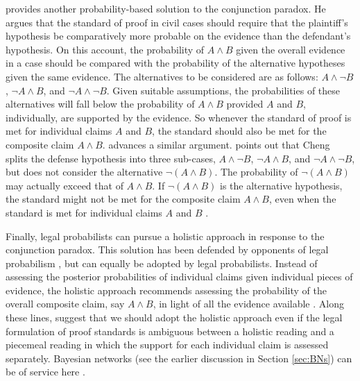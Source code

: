 \documentclass{article}
\begin{document}
 



\cite{cheng2012reconceptualizing} provides another probability-based solution to the conjunction paradox. He argues that the standard of proof in civil cases should require that the plaintiff's hypothesis be comparatively more probable on the evidence than the defendant's hypothesis. %
 On this account, the probability of $A\wedge B$ given the overall evidence in a case should be compared with the probability of the alternative hypotheses given the same evidence. The alternatives to be considered  are as follows: $A\wedge \neg B$, $\neg A \wedge B$, and $\neg A \wedge \neg B$. Given suitable assumptions, the probabilities of these alternatives will fall below the probability of $A\wedge B$ provided $A$ and $B$, individually, are supported by the evidence. So whenever the standard of proof is met for individual claims $A$ and $B$, the standard should also be met for the composite claim $A \wedge B$. \citet{kaplow2014likelihood} 
advances a similar argument.  
\citet{Urbaniak2019standards2} %
points out that Cheng splits the defense hypothesis into three sub-cases, $A\wedge \neg B$, $\neg A \wedge B$, and $\neg A \wedge \neg B$, but does not consider the  alternative $\neg (A \wedge B)$. 
 The probability of $\neg (A \wedge B)$ may actually exceed that of 
 $A\wedge B$. %
 If $\neg (A \wedge B)$ is the alternative hypothesis, the standard might not be met for the composite claim $A \wedge B$,   
 even when the standard is met for individual claims $A$ and $B$ \citep[for another critique of Cheng's approach, see][]{allen2013}.
 
 
 
 
 Finally, legal probabilists  can pursue a holistic approach in response to the conjunction paradox. %
 This solution has been defended  by opponents of legal probabilism \citep{Allen1986A-Reconceptuali,AllenPardo2019relative}, but can equally be adopted by legal probabilists. 
   Instead of assessing the posterior probabilities of individual claims given individual pieces of evidence, the holistic approach recommends assessing the probability of the overall composite claim, say $A \wedge B$, in light of all the evidence available \citep{dibello2019TrialStatisticsHigh}. Along these lines, \citet{HeddenColyvan2019legal} suggest that we should adopt the holistic approach even if the legal formulation of proof standards is ambiguous between a holistic reading and a piecemeal reading in which the support for each individual claim is assessed separately. 
   Bayesian networks (see the earlier discussion in Section \ref{sec:BNs}) 
   can be of service here  \citep{dezoete2018CombiningMultiplePieces,dezoete2017CombiningForensicEvidencea,Fenton2019Modelling}. 
   
\end{document}
